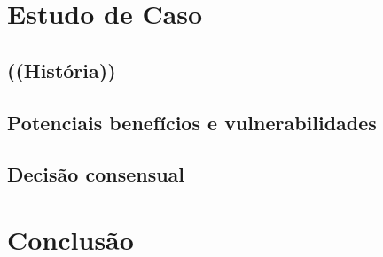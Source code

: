\documentclass[a4paper,dvipdfm]{article}
\begin{document}
\section{Estudo de Caso}
\subsection{((História))}
\subsection{Potenciais benefícios e vulnerabilidades}
\subsection{Decisão consensual}

\section{Conclusão}

\printglossaries
{}




%
\end{document}
